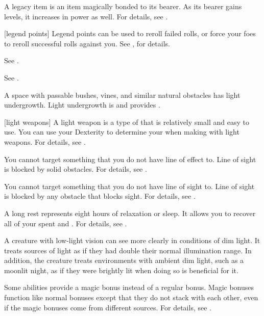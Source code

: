  A legacy item is an item magically bonded to its bearer.
As its bearer gains levels, it increases in power as well.
For details, see .

[legend points] Legend points can be used to reroll failed rolls, or force your foes to reroll successful rolls against you. See , for details.

 See .

 See .

 A space with passable bushes, vines, and similar natural obstacles has light undergrowth.
Light undergrowth is  and provides .

[light weapons] A light weapon is a type of  that is relatively small and easy to use.
You can use your Dexterity to determine your  when making  with light weapons.
For details, see .

 You cannot target something that you do not have line of effect to.
Line of sight is blocked by solid obstacles.
For details, see .

 You cannot target something that you do not have line of sight to.
Line of sight is blocked by any obstacle that blocks sight.
For details, see .

 A long rest represents eight hours of relaxation or sleep.
It allows you to recover all of your spent  and .
For details, see .

 A creature with low-light vision can see more clearly in conditions of dim light.
It treats sources of light as if they had double their normal illumination range.
In addition, the creature treats environments with ambient dim light, such as a moonlit night, as if they were brightly lit when doing so is beneficial for it.

 Some abilities provide a magic bonus instead of a regular bonus.
Magic bonuses function like normal bonuses except that they do not stack with each other, even if the magic bonuses come from different sources.
For details, see .

